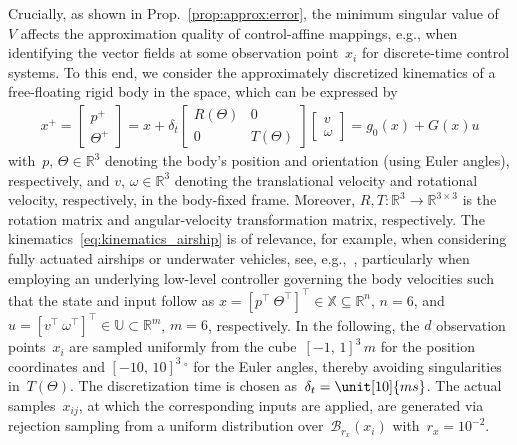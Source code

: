 \documentclass[a4paper, reqno]{amsart}
\begin{document}
Crucially, as shown in Prop.~\ref{prop:approx:error}, the minimum singular value of~$V$ affects the approximation quality of control-affine mappings, e.g., when identifying the vector fields at some observation point~$x_i$ for discrete-time control systems.
To this end, we consider the approximately discretized kinematics of a free-floating rigid body in the space, which can be expressed by
\begin{align}\label{eq:kinematics_airship}
    x^+ = 
    \begin{bmatrix}
        p^+ \\ \Theta^+
    \end{bmatrix} =
    x + \delta_t \begin{bmatrix}
        R (\Theta) & 0 \\
        0 & T (\Theta) 
    \end{bmatrix}
    \begin{bmatrix}
        v \\ \omega
    \end{bmatrix}
    = g_0 (x) + G(x) u 
\end{align}
with~$p, \, \Theta \in\mathbb{R}^3$ denoting the body's position and orientation (using Euler angles), respectively, and $v,\, \omega \in\mathbb{R}^3$ denoting the translational velocity and rotational velocity, respectively, in the body-fixed frame.
Moreover, $R,T\!: \mathbb{R}^3 \to \mathbb{R}^{3\times 3}$ is the rotation matrix and angular-velocity transformation matrix, respectively.
The kinematics~\eqref{eq:kinematics_airship} is of relevance, for example, when considering fully actuated airships or underwater vehicles, see, e.g.,~\cite{ChaabaniAzouz22,DueckerEtAl20}, particularly when employing an underlying low-level controller governing the body velocities such that the state and input follow as $x=[p^\top \ \Theta^\top]^\top\in\mathbb{X}\subseteq \mathbb{R}^n$, $n=6$, and $u = [v^\top \ \omega^\top]^\top \in\mathbb{U}\subset \mathbb{R}^m$, $m=6$, respectively.
%
In the following, the $d$ observation points~$x_i$ are sampled uniformly from the cube~$[-1, \, 1]^3\, \unit{m}$ for the position coordinates and $[-10, \, 10]^3 \,\unit{^\circ}$ for the Euler angles, thereby avoiding singularities in~$T(\Theta)$.
The discretization time is chosen as~$\delta_t = \unit[10]{ms}$.
%
The actual samples~$x_{ij}$, at which the corresponding inputs are applied, are generated via rejection sampling from a uniform distribution over~$\mathcal{B}_{r_x}(x_i)$ with~$r_x=10^{-2}$.
\end{document}
